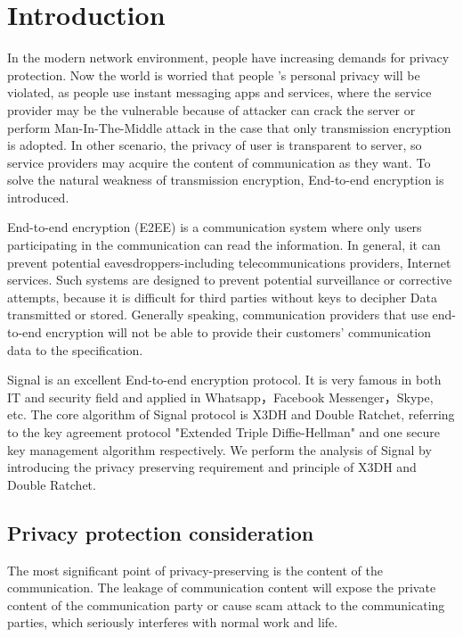 \documentclass[11pt,en]{elegantpaper}
\begin{document}
\section{Introduction}
In the modern network environment, people have increasing demands for privacy protection. Now the world is worried that people ’s personal privacy will be violated, as people use instant messaging apps and services, where the service provider may be the vulnerable because of attacker can crack the server or perform Man-In-The-Middle attack in the case that only transmission encryption is adopted. In other scenario, the privacy of user is transparent to server, so service providers may acquire the content of communication as they want. To solve the natural weakness of transmission encryption, End-to-end encryption is introduced.

End-to-end encryption (E2EE) is a communication system where only users participating in the communication can read the information. In general, it can prevent potential eavesdroppers-including telecommunications providers, Internet services. Such systems are designed to prevent potential surveillance or corrective attempts, because it is difficult for third parties without keys to decipher Data transmitted or stored. Generally speaking, communication providers that use end-to-end encryption will not be able to provide their customers' communication data to the specification.

Signal is an excellent End-to-end encryption protocol.\cite{alwen2019double} It is very famous in both IT and security field and applied in Whatsapp，Facebook Messenger，Skype, etc. The core algorithm of Signal protocol is X3DH and Double Ratchet, referring to the key agreement protocol "Extended Triple Diffie-Hellman" and one secure key management algorithm respectively.
We perform the analysis of Signal by introducing the privacy preserving requirement and principle of X3DH and Double Ratchet.

\subsection{Privacy protection consideration}
The most significant point of privacy-preserving is the content of the communication. The leakage of communication content will expose the private content of the communication party or cause scam attack to the communicating parties, which seriously interferes with normal work and life.
\end{document}
